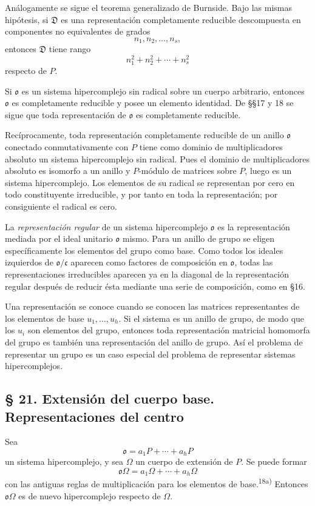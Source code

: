 \documentclass[11pt]{article}
\providecommand{\mo}{\mathfrak{o}}
\providecommand{\mc}{\mathfrak{c}}
\begin{document}
Análogamente se sigue el teorema generalizado de Burnside. Bajo las mismas hipótesis, si $\mathfrak D$ es una representación completamente reducible descompuesta en componentes no equivalentes de grados
\[
        n_1,n_2,\ldots,n_s,
\]
entonces $\mathfrak D$ tiene rango
\[
        n_1^2+n_2^2+\cdots+n_s^2
\]
respecto de $P$.

Si $\mo$ es un sistema hipercomplejo sin radical sobre un cuerpo arbitrario, entonces $\mo$ es completamente reducible y posee un elemento identidad. De §§17 y 18 se sigue que toda representación de $\mo$ es completamente reducible.

Recíprocamente, toda representación completamente reducible de un anillo $\mo$ conectado conmutativamente con $P$ tiene como dominio de multiplicadores absoluto un sistema hipercomplejo sin radical. Pues el dominio de multiplicadores absoluto es isomorfo a un anillo y $P$-módulo de matrices sobre $P$, luego es un sistema hipercomplejo. Los elementos de su radical se representan por cero en todo constituyente irreducible, y por tanto en toda la representación; por consiguiente el radical es cero.

La \emph{representación regular} de un sistema hipercomplejo $\mo$ es la representación mediada por el ideal unitario $\mo$ mismo. Para un anillo de grupo se eligen específicamente los elementos del grupo como base. Como todos los ideales izquierdos de $\mo/\mc$ aparecen como factores de composición en $\mo$, todas las representaciones irreducibles aparecen ya en la diagonal de la representación regular después de reducir ésta mediante una serie de composición, como en §16.

Una representación se conoce cuando se conocen las matrices representantes de los elementos de base $u_1,\ldots,u_h$. Si el sistema es un anillo de grupo, de modo que los $u_i$ son elementos del grupo, entonces toda representación matricial homomorfa del grupo es también una representación del anillo de grupo. Así el problema de representar un grupo es un caso especial del problema de representar sistemas hipercomplejos.

\subsection*{§ 21. Extensión del cuerpo base. Representaciones del centro}

Sea
\[
        \mo=a_1P+\cdots+a_hP
\]
un sistema hipercomplejo, y sea $\Omega$ un cuerpo de extensión de $P$. Se puede formar
\[
        \mo\Omega=a_1\Omega+\cdots+a_h\Omega
\]
con las antiguas reglas de multiplicación para los elementos de base.\textsuperscript{18a)} Entonces $\mo\Omega$ es de nuevo hipercomplejo respecto de $\Omega$.
\end{document}

